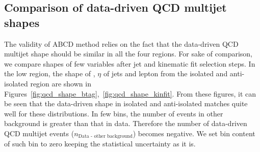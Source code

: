 \subsection{Comparison of data-driven QCD multijet shapes}
The validity of ABCD method relies on the fact that the data-driven QCD multijet shape should be 
similar in all the four regions. For sake of comparison, we compare shapes of few variables after
\PQb jet and kinematic fit selection steps. In the low \MET region, the shape of \pt, $\eta$ of 
jets and lepton from the isolated and anti-isolated region are shown in 
Figures~\ref{fig:qcd_shape_btag},~\ref{fig:qcd_shape_kinfit}. From these figures, it can be seen that 
the data-driven shape in isolated and anti-isolated matches quite well for these distributions. In few
bins, the number of events in other background is greater than that in data. Therefore the number of
data-driven QCD multijet events ($n_{\text{Data - other background}}$) becomes negative. We set bin 
content of such bin to zero keeping the statistical uncertainty as it is. 
